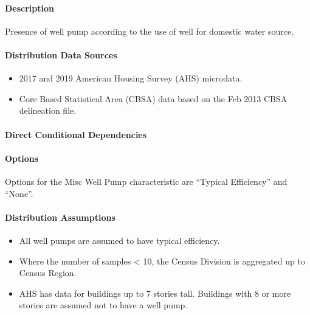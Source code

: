 \paragraph{Description}
% 
Presence of well pump according to the use of well for domestic water source.

\paragraph{Distribution Data Sources}
% 
\begin{itemize}
    \item 2017 and 2019 American Housing Survey (AHS) microdata.
    \item Core Based Statistical Area (CBSA) data based on the Feb 2013 CBSA delineation file.
\end{itemize}

\paragraph{Direct Conditional Dependencies}


\paragraph{Options}
Options for the Misc Well Pump characteristic are ``Typical Efficiency'' and ``None''.

\paragraph{Distribution Assumptions}
% 
\begin{itemize}
	\item All well pumps are assumed to have typical efficiency.
	\item Where the number of samples < 10, the Census Division is aggregated up to Census Region.
	\item AHS has data for buildings up to 7 stories tall. Buildings with 8 or more stories are assumed not to have a well pump.
\end{itemize}
